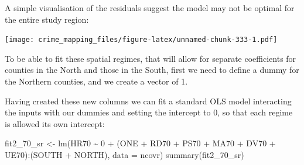 \documentclass[
  krantz2]{krantz}
\makeatletter
\newenvironment{Shaded}{\begin{snugshade}}{\end{snugshade}}
\newcommand{\AttributeTok}[1]{\textcolor[rgb]{0.61,0.61,0.61}{#1}}
\newcommand{\DecValTok}[1]{\textcolor[rgb]{0.06,0.06,0.06}{#1}}
\newcommand{\FunctionTok}[1]{\textcolor[rgb]{0,0,0}{#1}}
\newcommand{\NormalTok}[1]{#1}
\newcommand{\OtherTok}[1]{\textcolor[rgb]{0.37,0.37,0.37}{#1}}
\newcommand{\SpecialCharTok}[1]{\textcolor[rgb]{0,0,0}{#1}}
\newcommand{\StringTok}[1]{\textcolor[rgb]{0.5,0.5,0.5}{#1}}
\newenvironment{kframe}{%
\medskip{}
\setlength{\fboxsep}{.8em}
 \def\at@end@of@kframe{}%
 \ifinner\ifhmode%
  \def\at@end@of@kframe{\end{minipage}}%
  \begin{minipage}{\columnwidth}%
 \fi\fi%
 \def\FrameCommand##1{\hskip\@totalleftmargin \hskip-\fboxsep
 \colorbox{shadecolor}{##1}\hskip-\fboxsep
     \hskip-\linewidth \hskip-\@totalleftmargin \hskip\columnwidth}%
 \MakeFramed {\advance\hsize-\width
   \@totalleftmargin\z@ \linewidth\hsize
   \@setminipage}}%
 {\par\unskip\endMakeFramed%
 \at@end@of@kframe}
\renewenvironment{Shaded}{\begin{kframe}}{\end{kframe}}
\makeatother
\begin{document}
A simple visualisation of the residuals suggest the model may not be optimal for the entire study region:

\begin{Shaded}
\end{Shaded}

\texttt{[image: crime\_mapping\_files/figure-latex/unnamed-chunk-333-1.pdf]}

To be able to fit these spatial regimes, that will allow for separate coefficients for counties in the North and those in the South, first we need to define a dummy for the Northern counties, and we create a vector of 1.

\begin{Shaded}
\end{Shaded}

Having created these new columns we can fit a standard OLS model interacting the inputs with our dummies and setting the intercept to 0, so that each regime is allowed its own intercept:

\begin{Shaded}
\begin{Highlighting}[]
\NormalTok{fit2\_70\_sr }\OtherTok{\textless{}{-}} \FunctionTok{lm}\NormalTok{(HR70 }\SpecialCharTok{\textasciitilde{}} \DecValTok{0} \SpecialCharTok{+}\NormalTok{ (ONE }\SpecialCharTok{+}\NormalTok{ RD70 }\SpecialCharTok{+}\NormalTok{ PS70 }\SpecialCharTok{+}\NormalTok{ MA70 }\SpecialCharTok{+}\NormalTok{ DV70 }\SpecialCharTok{+}\NormalTok{ UE70)}\SpecialCharTok{:}\NormalTok{(SOUTH }\SpecialCharTok{+}\NormalTok{ NORTH), }\AttributeTok{data =}\NormalTok{ ncovr)}
\FunctionTok{summary}\NormalTok{(fit2\_70\_sr)}
\end{Highlighting}
\end{Shaded}
\end{document}
